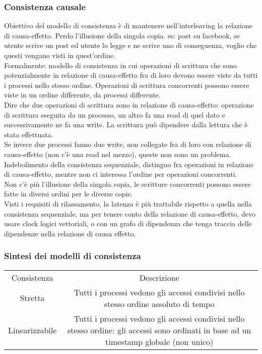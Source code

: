 \documentclass[16px]{article}
\begin{document}
\subsubsection{Consistenza causale}
Obiettivo del modello di consistenza è di mantenere nell'interleaving la relazione di causa-effetto. Perdo l'illusione della singola copia. es: post su facebook, se utente scrive un post ed utente lo legge e ne scrive uno di conseguenza, voglio che questi vengano visti in quest'ordine.\\ Formalmente: modello di consistenza in cui operazioni di scrittura che sono potenzialmente in relazione di causa-effetto fra di loro devono essere viste da tutti i processi nello stesso ordine. Operazioni di scrittura concorrenti possono essere viste in un ordine differente, da processi differente.\\ Dire che due operazioni di scrittura sono in relazione di causa-effetto: operazione di scrittura eseguita da un processo, un altro fa una read di quel dato e successivamente ne fa una write. La scrittura può dipendere dalla lettura che è stata effettuata.\\ Se invece due processi fanno due write, non collegate fra di loro con relazione di causa-effetto (non c'è una read nel mezzo), queste non sono un problema.\\ Indebolimento della consistenza sequenziale, distinguo fra operazioni in relazione di causa-effetto, mentre non ci interessa l'ordine per operazioni concorrenti.\\ Non c'è più l'illusione della singola copia, le scritture concorrenti possono essere fatte in diversi ordini per le diverse copie.\\ Visti i requisiti di rilassamento, la latenza è più trattabile rispetto a quella nella consistenza sequenziale, ma per tenere conto della relazione di causa-effetto, devo usare clock logici vettoriali, o con un grafo di dipendenza che tenga traccia delle dipendenze nella relazione di causa effetto.
\subsubsection{Sintesi dei modelli di consistenza}
\begin{table}
\begin{tabular}{ c c }
Consistenza & Descrizione\\
Stretta & Tutti i processi vedono gli accessi condivisi nello stesso ordine assoluto di tempo\\
Linearizzabile & Tutti i processi vedono gli accessi condivisi nello stesso ordine: gli accessi sono ordinati in base ad un timestamp globale (non unico)
\end{tabular}
\end{table}
\end{document}
